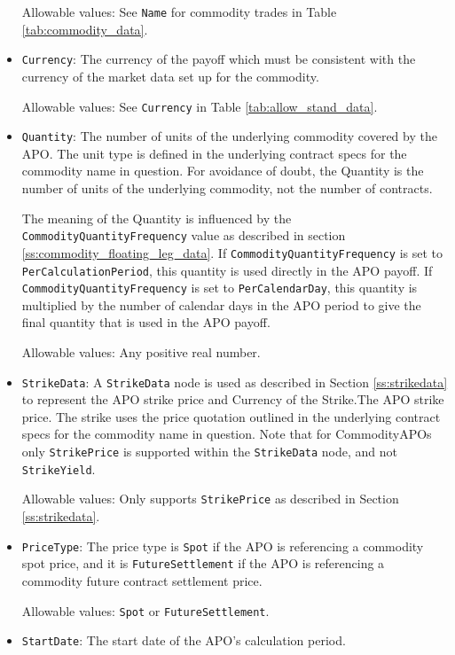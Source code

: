 \begin{itemize}
Allowable values:  See \lstinline!Name! for commodity trades in Table \ref{tab:commodity_data}.

\item \lstinline!Currency!: The currency of the payoff which must be consistent with the currency of the market data set up for the commodity.

Allowable values: See \lstinline!Currency!  in Table \ref{tab:allow_stand_data}.

\item \lstinline!Quantity!:  The number of units of the underlying commodity covered by the APO. The unit type is defined in the underlying contract specs for the commodity name in question. For avoidance of doubt, the Quantity is the number of units of the underlying commodity, not the number of contracts.

The meaning of the Quantity is influenced by the \lstinline!CommodityQuantityFrequency! value as described in section \ref{ss:commodity_floating_leg_data}. If \lstinline!CommodityQuantityFrequency! is set to \lstinline!PerCalculationPeriod!, this quantity is used directly in the APO payoff. If \lstinline!CommodityQuantityFrequency! is set to \lstinline!PerCalendarDay!, this quantity is multiplied by the number of calendar days in the APO period to give the final quantity that is used in the APO payoff.

Allowable values: Any positive real number.

\item \lstinline!StrikeData!: A \lstinline!StrikeData! node is used as described in Section \ref{ss:strikedata} to represent the APO strike price and Currency of the Strike.The APO strike price. The strike uses the price quotation outlined in the underlying contract specs for the commodity name in question. Note that for CommodityAPOs only \lstinline!StrikePrice!  is supported within the \lstinline!StrikeData! node, and not \lstinline!StrikeYield!. 

Allowable values: Only supports \lstinline!StrikePrice! as described in Section \ref{ss:strikedata}.

\item \lstinline!PriceType!: The price type is \lstinline!Spot! if the APO is referencing a commodity spot price, and it is \lstinline!FutureSettlement! if the APO is referencing a commodity future contract settlement price.

Allowable values: \lstinline!Spot! or \lstinline!FutureSettlement!.

\item \lstinline!StartDate!: The start date of the APO's calculation period.


\end{itemize}
